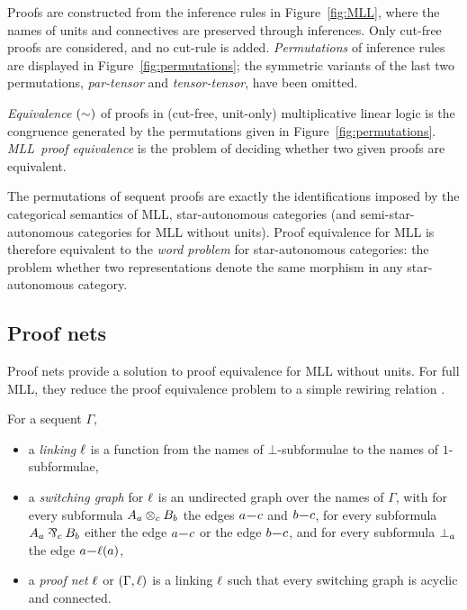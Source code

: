 \documentclass{sigplanconf}
\let\aftersubsection=\noindent
\let\capsabbrev=\uppercase
\begin{document}
Proofs are constructed from the inference rules in Figure~\ref{fig:MLL}, where the names of units and connectives are preserved through inferences.
%
Only cut-free proofs are considered, and no cut-rule is added.
%
\emph{Permutations} of inference rules are displayed in Figure~\ref{fig:permutations}; the symmetric variants of the last two permutations, \emph{par-tensor} and \emph{tensor-tensor}, have been omitted.



\begin{definition}
\label{def:equivalence}
%
\emph{Equivalence} $(\perm)$ of proofs in (cut-free, unit-only) multiplicative linear logic is the congruence generated by the permutations given in Figure~\ref{fig:permutations}.
%
\emph{\capsabbrev{mll}\ proof equivalence} is the problem of deciding whether two given proofs are equivalent.
%
\end{definition}


The permutations of sequent proofs are exactly the identifications imposed by the categorical semantics of \capsabbrev{mll}, star-autonomous categories \cite{Barr-1991} (and semi-star-autonomous categories \cite{Houston-2008,Heijltjes-Strassburger} for \capsabbrev{mll} without units).
%
Proof equivalence for \capsabbrev{mll} is therefore equivalent to the \emph{word problem} for star-autonomous categories: the problem whether two representations denote the same morphism in any star-autonomous category.



\subsection*{Proof nets}

\aftersubsection
Proof nets provide a solution to proof equivalence for \capsabbrev{mll} without units.
%
For full \capsabbrev{mll}, they reduce the proof equivalence problem to a simple rewiring relation \cite{HughesMLLProofNets}.


\begin{definition}
\label{def:proof nets}
%
For a sequent $\Gamma$,
\begin{itemize}

	\item
	a \emph{linking} $\links$ is a function from the names of $\bot$-subformulae to the names of $1$-subformulae,

	\item
	a \emph{switching graph} for $\links$ is an undirected graph over the names of $\Gamma$, with for every subformula $\named aA\named c\tn\named bB$ the edges $\edge ac$ and $\edge bc$, for every subformula $\named aA\named c\parr\named bB$ either the edge $\edge ac$ or the edge $\edge bc$, and for every subformula $\named a\bot$ the edge $\edge a{\links(a)}$,

 	\item
	a \emph{proof net} $\links$ or $(\Gamma,\links)$ is a linking $\links$ such that every switching graph is acyclic and connected.

\end{itemize}
\end{definition}
\end{document}
